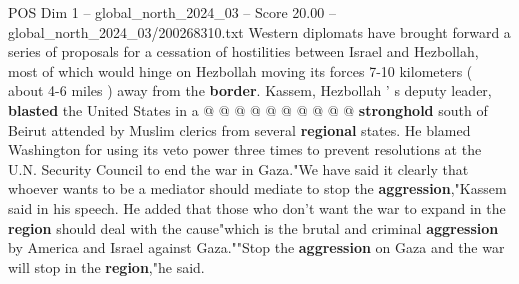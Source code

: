 \begin{textsample}{POS Dim 1 – global\_north\_2024\_03 – Score 20.00 – global\_north\_2024\_03/200268310.txt}
Western diplomats have brought forward a series of proposals for a cessation of hostilities between Israel and Hezbollah, most of which would hinge on Hezbollah moving its forces 7-10 kilometers ( about 4-6 miles ) away from the \textbf{border}.
Kassem, Hezbollah ' s deputy leader, \textbf{blasted} the United States in a @ @ @ @ @ @ @ @ @ @ \textbf{stronghold} south of Beirut attended by Muslim clerics from several \textbf{regional} states.
He blamed Washington for using its veto power three times to prevent resolutions at the U.N.
Security Council to end the war in Gaza."We have said it clearly that whoever wants to be a mediator should mediate to stop the \textbf{aggression},"Kassem said in his speech.
He added that those who don't want the war to expand in the \textbf{region} should deal with the cause"which is the brutal and criminal \textbf{aggression} by America and Israel against Gaza.""Stop the \textbf{aggression} on Gaza and the war will stop in the \textbf{region},"he said.

\end{textsample}

